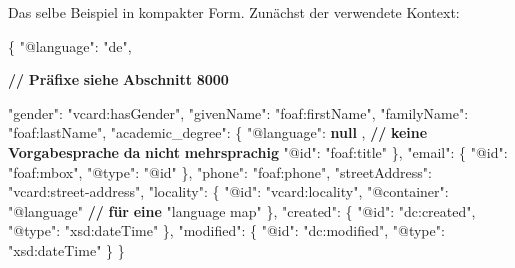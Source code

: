 \documentclass[,a4paper]{article}
\newenvironment{Shaded}{}{}
\newcommand{\KeywordTok}[1]{\textcolor[rgb]{0.00,0.44,0.13}{\textbf{{#1}}}}
\newcommand{\DataTypeTok}[1]{\textcolor[rgb]{0.56,0.13,0.00}{{#1}}}
\newcommand{\StringTok}[1]{\textcolor[rgb]{0.25,0.44,0.63}{{#1}}}
\newcommand{\FunctionTok}[1]{\textcolor[rgb]{0.02,0.16,0.49}{{#1}}}
\newcommand{\ErrorTok}[1]{\textcolor[rgb]{1.00,0.00,0.00}{\textbf{{#1}}}}
\begin{document}
Das selbe Beispiel in kompakter Form. Zunächst der verwendete Kontext:

\begin{Shaded}
\begin{Highlighting}[]
\FunctionTok{\{}
    \DataTypeTok{"@language"}\FunctionTok{:} \StringTok{"de"}\FunctionTok{,}
    
    \ErrorTok{//} \ErrorTok{Präfixe} \ErrorTok{siehe} \ErrorTok{Abschnitt} \ErrorTok{8000}

    \DataTypeTok{"gender"}\FunctionTok{:} \StringTok{"vcard:hasGender"}\FunctionTok{,}
    \DataTypeTok{"givenName"}\FunctionTok{:} \StringTok{"foaf:firstName"}\FunctionTok{,}
    \DataTypeTok{"familyName"}\FunctionTok{:} \StringTok{"foaf:lastName"}\FunctionTok{,}
    \DataTypeTok{"academic_degree"}\FunctionTok{:} \FunctionTok{\{}
        \DataTypeTok{"@language"}\FunctionTok{:} \KeywordTok{null} \FunctionTok{,} \ErrorTok{//} \ErrorTok{keine} \ErrorTok{Vorgabesprache} \ErrorTok{da} \ErrorTok{nicht} \ErrorTok{mehrsprachig}
        \DataTypeTok{"@id"}\FunctionTok{:} \StringTok{"foaf:title"}
    \FunctionTok{\},}
    \DataTypeTok{"email"}\FunctionTok{:} \FunctionTok{\{}
        \DataTypeTok{"@id"}\FunctionTok{:} \StringTok{"foaf:mbox"}\FunctionTok{,}
        \DataTypeTok{"@type"}\FunctionTok{:} \StringTok{"@id"}
    \FunctionTok{\},}
    \DataTypeTok{"phone"}\FunctionTok{:} \StringTok{"foaf:phone"}\FunctionTok{,}
    \DataTypeTok{"streetAddress"}\FunctionTok{:} \StringTok{"vcard:street-address"}\FunctionTok{,}
    \DataTypeTok{"locality"}\FunctionTok{:} \FunctionTok{\{}
        \DataTypeTok{"@id"}\FunctionTok{:} \StringTok{"vcard:locality"}\FunctionTok{,}
        \DataTypeTok{"@container"}\FunctionTok{:} \StringTok{"@language"} \ErrorTok{//} \ErrorTok{für} \ErrorTok{eine} \StringTok{"language map"}
    \FunctionTok{\},}
    \DataTypeTok{"created"}\FunctionTok{:} \FunctionTok{\{}
        \DataTypeTok{"@id"}\FunctionTok{:} \StringTok{"dc:created"}\FunctionTok{,}
        \DataTypeTok{"@type"}\FunctionTok{:} \StringTok{"xsd:dateTime"}
    \FunctionTok{\},}
    \DataTypeTok{"modified"}\FunctionTok{:} \FunctionTok{\{}
        \DataTypeTok{"@id"}\FunctionTok{:} \StringTok{"dc:modified"}\FunctionTok{,}
        \DataTypeTok{"@type"}\FunctionTok{:} \StringTok{"xsd:dateTime"}
    \FunctionTok{\}}
\FunctionTok{\}}
\end{Highlighting}
\end{Shaded}
\end{document}
